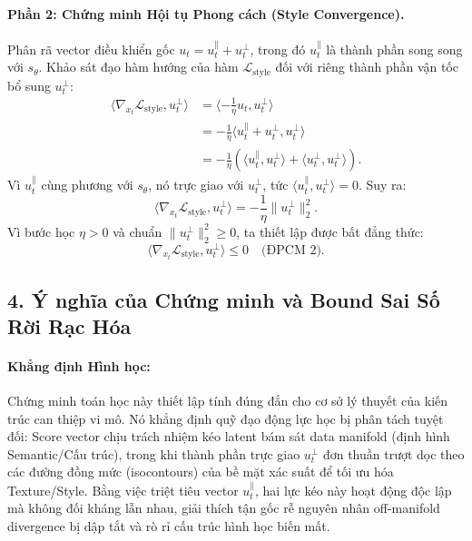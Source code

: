\documentclass[runningheads]{llncs}
\begin{document}
\paragraph{Phần 2: Chứng minh Hội tụ Phong cách (Style Convergence).}
Phân rã vector điều khiển gốc $u_t = u_t^\parallel + u_t^\perp$, trong đó $u_t^\parallel$ là thành phần song song với $s_\theta$.
Khảo sát đạo hàm hướng của hàm $\mathcal{L}_{\text{style}}$ đối với riêng thành phần vận tốc bổ sung $u_t^\perp$:
\begin{align}
    \langle \nabla_{x_t} \mathcal{L}_{\text{style}}, u_t^\perp \rangle &= \langle -\frac{1}{\eta} u_t, u_t^\perp \rangle \\
    &= -\frac{1}{\eta} \langle u_t^\parallel + u_t^\perp, u_t^\perp \rangle \\
    &= -\frac{1}{\eta} \left( \langle u_t^\parallel, u_t^\perp \rangle + \langle u_t^\perp, u_t^\perp \rangle \right).
\end{align}
Vì $u_t^\parallel$ cùng phương với $s_\theta$, nó trực giao với $u_t^\perp$, tức $\langle u_t^\parallel, u_t^\perp \rangle = 0$. Suy ra:
\begin{equation}
    \langle \nabla_{x_t} \mathcal{L}_{\text{style}}, u_t^\perp \rangle = -\frac{1}{\eta} \|u_t^\perp\|_2^2.
\end{equation}
Vì bước học $\eta > 0$ và chuẩn $\|u_t^\perp\|_2^2 \ge 0$, ta thiết lập được bất đẳng thức:
\begin{equation}
    \langle \nabla_{x_t} \mathcal{L}_{\text{style}}, u_t^\perp \rangle \le 0 \quad \text{(ĐPCM 2)}.
\end{equation}

\subsection*{4. Ý nghĩa của Chứng minh và Bound Sai Số Rời Rạc Hóa}

\paragraph{Khẳng định Hình học:} 
Chứng minh toán học này thiết lập tính đúng đắn cho cơ sở lý thuyết của kiến trúc can thiệp vi mô. Nó khẳng định quỹ đạo động lực học bị phân tách tuyệt đối: Score vector chịu trách nhiệm kéo latent bám sát data manifold (định hình Semantic/Cấu trúc), trong khi thành phần trực giao $u_t^\perp$ đơn thuần trượt dọc theo các đường đồng mức (isocontours) của bề mặt xác suất để tối ưu hóa Texture/Style. Bằng việc triệt tiêu vector $u_t^\parallel$, hai lực kéo này hoạt động độc lập mà không đối kháng lẫn nhau, giải thích tận gốc rễ nguyên nhân off-manifold divergence bị dập tắt và rò rỉ cấu trúc hình học biến mất.
\end{document}
